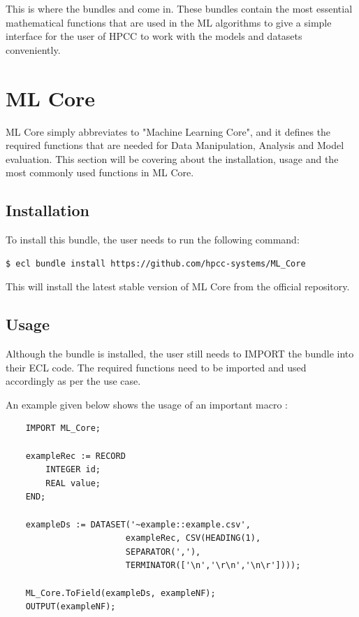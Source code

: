 \documentclass[a4paper,oneside,12pt]{book}
\begin{document}
This is where the bundles  and  come in. These bundles contain the most essential mathematical functions that are used in the ML algorithms to give a simple interface for the user of HPCC to work with the models and datasets conveniently.

\section{ML Core}\label{sec:mlcore}

ML Core simply abbreviates to "Machine Learning Core", and it defines the required functions that are needed for Data Manipulation, Analysis and Model evaluation. This section will be covering about the installation, usage and the most commonly used functions in ML Core.

\subsection{Installation}

To install this bundle, the user needs to run the following command:

\begin{lstlisting}[language=bash]
    $ ecl bundle install https://github.com/hpcc-systems/ML_Core
\end{lstlisting}

This will install the latest stable version of ML Core from the official repository.

\subsection{Usage}

Although the bundle is installed, the user still needs to IMPORT the bundle into their ECL code. The required functions need to be imported and used accordingly as per the use case.

An example given below shows the usage of an important macro \textbf{}:

\begin{lstlisting}
    IMPORT ML_Core;
    
    exampleRec := RECORD
        INTEGER id;
        REAL value;
    END;
    
    exampleDs := DATASET('~example::example.csv', 
                        exampleRec, CSV(HEADING(1),
                        SEPARATOR(','),
                        TERMINATOR(['\n','\r\n','\n\r'])));
    
    ML_Core.ToField(exampleDs, exampleNF);
    OUTPUT(exampleNF);
\end{lstlisting}
\end{document}
